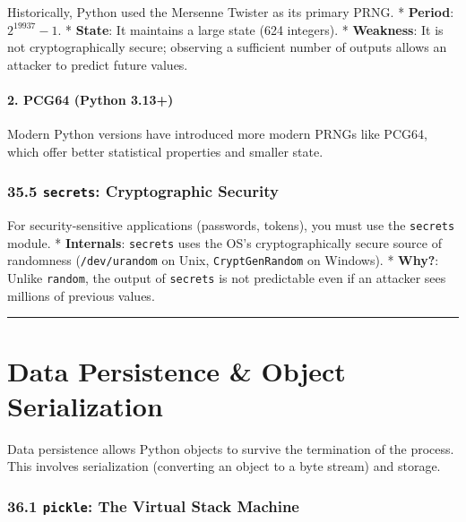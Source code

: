Historically, Python used the Mersenne Twister as its primary PRNG. *
\textbf{Period}: \(2^{19937} - 1\). * \textbf{State}: It maintains a
large state (624 integers). * \textbf{Weakness}: It is not
cryptographically secure; observing a sufficient number of outputs
allows an attacker to predict future values.

\hypertarget{pcg64-python-3.13}{%
\subsubsection{2. PCG64 (Python 3.13+)}\label{pcg64-python-3.13}}

Modern Python versions have introduced more modern PRNGs like PCG64,
which offer better statistical properties and smaller state.

\hypertarget{secrets-cryptographic-security}{%
\subsection{\texorpdfstring{35.5 \texttt{secrets}: Cryptographic
Security}{35.5 secrets: Cryptographic Security}}\label{secrets-cryptographic-security}}

For security-sensitive applications (passwords, tokens), you must use
the \passthrough{\lstinline!secrets!} module. * \textbf{Internals}:
\passthrough{\lstinline!secrets!} uses the OS's cryptographically secure
source of randomness (\passthrough{\lstinline!/dev/urandom!} on Unix,
\passthrough{\lstinline!CryptGenRandom!} on Windows). * \textbf{Why?}:
Unlike \passthrough{\lstinline!random!}, the output of
\passthrough{\lstinline!secrets!} is not predictable even if an attacker
sees millions of previous values.

\begin{center}\rule{0.5\linewidth}{0.5pt}\end{center}

\hypertarget{data-persistence-object-serialization}{%
\chapter{Data Persistence \& Object
Serialization}\label{data-persistence-object-serialization}}

Data persistence allows Python objects to survive the termination of the
process. This involves serialization (converting an object to a byte
stream) and storage.

\hypertarget{pickle-the-virtual-stack-machine}{%
\subsection{\texorpdfstring{36.1 \texttt{pickle}: The Virtual Stack
Machine}{36.1 pickle: The Virtual Stack Machine}}\label{pickle-the-virtual-stack-machine}}

